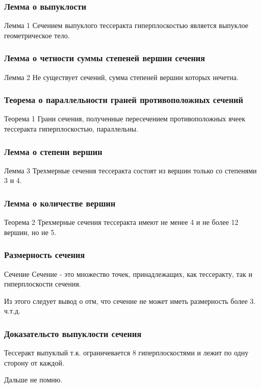 \documentclass[10pt,pdf,hyperref={unicode}]{beamer}
\begin{document}
\begin{frame}
	\frametitle{Лемма о выпуклости}
	\begin{block}{Лемма 1}
		Сечением выпуклого тессеракта гиперплоскостью является выпуклое геометрическое тело.
	\end{block}
\end{frame}
\begin{frame}
	\frametitle{Лемма о четности суммы степеней вершин сечения}
	\begin{block}{Лемма 2}
		Не существует сечений, сумма степеней вершин которых нечетна.
	\end{block}
\end{frame}
\begin{frame}
	\frametitle{Теорема о параллельности граней противоположных сечений}
	\begin{block}{Теорема 1}
		Грани сечения, полученные пересечением противоположных ячеек тессеракта гиперплоскостью, параллельны.
	\end{block}
\end{frame}
\begin{frame}
	\frametitle{Лемма о степени вершин}
	\begin{block}{Лемма 3}
		Трехмерные сечения тессеракта состоят из вершин только со степенями 3 и 4.
	\end{block}
\end{frame}
\begin{frame}
	\frametitle{Лемма о количестве вершин}
	\begin{block}{Теорема 2}
		Трехмерные сечения тессеракта имеют не менее 4 и не более 12 вершин, но не 5.
	\end{block}
\end{frame}
\begin{frame}
	\frametitle{Размерность сечения}
	\begin{block}{Сечение}
		Сечение - это множество точек, принадлежащих, как тессеракту, так и гиперплоскости сечения.
	\end{block}
	Из этого следует вывод о отм, что сечение не может иметь размерность более 3. \\
	ч.т.д.
\end{frame}
\begin{frame}
	\frametitle{Доказательсто выпуклости сечения}
	\begin{block}{Тессеракт выпуклый}
		т.к. ограничевается 8 гиперплоскостями и лежит по одну сторону от каждой.
	\end{block}
	Дальше не помню.	
\end{frame}
\end{document}

